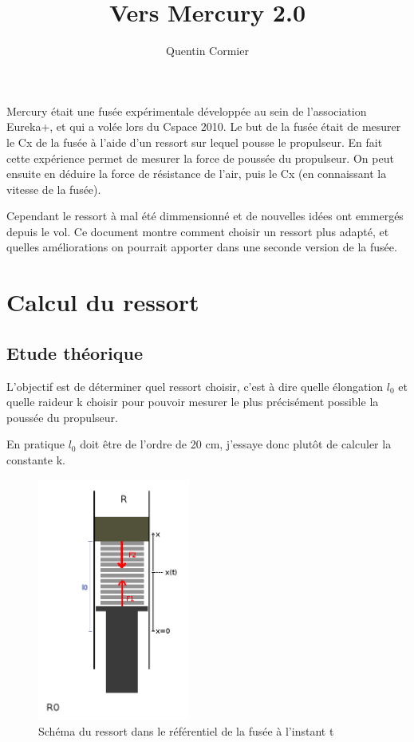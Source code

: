 \documentclass[a4paper,12pt]{scrartcl}
\title{Vers Mercury 2.0}
\author{Quentin Cormier}
\begin{document}
\maketitle

Mercury était une fusée expérimentale développée au sein de l'association  Eureka+, et qui a volée lors du Cspace 2010.
Le but de la fusée était de mesurer le Cx de la fusée à l'aide d'un ressort sur lequel pousse le propulseur.
En fait cette expérience permet de mesurer la force de poussée du propulseur. On peut ensuite en déduire la force de résistance de l'air, puis le Cx (en connaissant la vitesse de la fusée).

Cependant le ressort à mal été dimmensionné et de nouvelles idées ont emmergés depuis le vol. Ce document montre comment choisir un ressort plus adapté, et quelles améliorations on pourrait apporter dans une seconde version de la fusée.

\section{Calcul du ressort}

\subsection{Etude théorique}
L'objectif est de déterminer quel ressort choisir, c'est à dire quelle élongation $l_0$ et quelle raideur k choisir pour pouvoir mesurer le plus précisément possible la poussée du propulseur.


En pratique $l_0$ doit être de l'ordre de 20 cm, j'essaye donc plutôt de calculer la constante k. \newpage

\begin{figure}
\caption{Schéma du ressort dans le référentiel de la fusée à l'instant t}
\includegraphics[width=5cm]{schema_t.png}
\end{figure}
\end{document}
